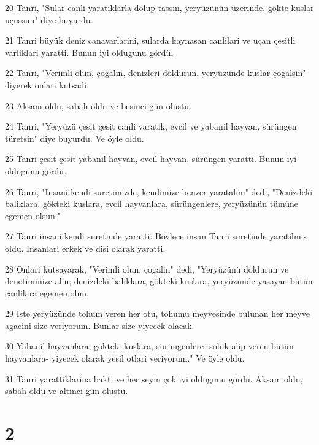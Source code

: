 \par 20 Tanri, "Sular canli yaratiklarla dolup tassin, yeryüzünün üzerinde, gökte kuslar uçussun" diye buyurdu.
\par 21 Tanri büyük deniz canavarlarini, sularda kaynasan canlilari ve uçan çesitli varliklari yaratti. Bunun iyi oldugunu gördü.
\par 22 Tanri, "Verimli olun, çogalin, denizleri doldurun, yeryüzünde kuslar çogalsin" diyerek onlari kutsadi.
\par 23 Aksam oldu, sabah oldu ve besinci gün olustu.
\par 24 Tanri, "Yeryüzü çesit çesit canli yaratik, evcil ve yabanil hayvan, sürüngen türetsin" diye buyurdu. Ve öyle oldu.
\par 25 Tanri çesit çesit yabanil hayvan, evcil hayvan, sürüngen yaratti. Bunun iyi oldugunu gördü.
\par 26 Tanri, "Insani kendi suretimizde, kendimize benzer yaratalim" dedi, "Denizdeki baliklara, gökteki kuslara, evcil hayvanlara, sürüngenlere, yeryüzünün tümüne egemen olsun."
\par 27 Tanri insani kendi suretinde yaratti. Böylece insan Tanri suretinde yaratilmis oldu. Insanlari erkek ve disi olarak yaratti.
\par 28 Onlari kutsayarak, "Verimli olun, çogalin" dedi, "Yeryüzünü doldurun ve denetiminize alin; denizdeki baliklara, gökteki kuslara, yeryüzünde yasayan bütün canlilara egemen olun.
\par 29 Iste yeryüzünde tohum veren her otu, tohumu meyvesinde bulunan her meyve agacini size veriyorum. Bunlar size yiyecek olacak.
\par 30 Yabanil hayvanlara, gökteki kuslara, sürüngenlere -soluk alip veren bütün hayvanlara- yiyecek olarak yesil otlari veriyorum." Ve öyle oldu.
\par 31 Tanri yarattiklarina bakti ve her seyin çok iyi oldugunu gördü. Aksam oldu, sabah oldu ve altinci gün olustu.

\chapter{2}

